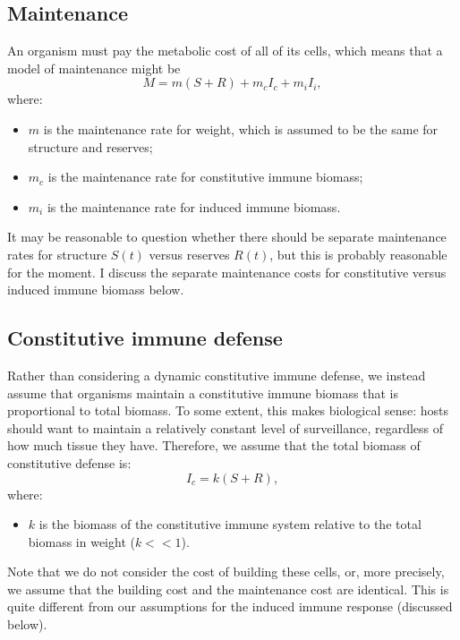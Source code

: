 \documentclass[11pt,reqno,final,pdftex]{amsart}\usepackage[]{graphicx}\usepackage[]{color}
\theoremstyle{plain}
\numberwithin{equation}{part}
\begin{document}
\subsection*{Maintenance}
An organism must pay the metabolic cost of all of its cells, which means that a model of maintenance might be
\begin{equation}
M=m(S+R)+m_cI_c+m_iI_i,
\end{equation}
where:
\begin{itemize}
\item $m$ is the maintenance rate for weight, which is assumed to be the same for structure and reserves;
\item $m_c$ is the maintenance rate for constitutive immune biomass;
\item $m_i$ is the maintenance rate for induced immune biomass.
\end{itemize}


It may be reasonable to question whether there should be separate maintenance rates for structure $S(t)$ versus reserves $R(t)$, but this is
probably reasonable for the moment. I discuss the separate maintenance costs for constitutive versus induced immune biomass below.

\subsection*{Constitutive immune defense}
Rather than considering a dynamic constitutive immune defense, we instead assume that organisms maintain a constitutive immune biomass that is proportional to total biomass. To some extent, this makes biological sense: hosts should want to maintain a relatively constant level of surveillance, regardless of how much tissue they have. Therefore, we assume that the total biomass of constitutive defense is:
\begin{equation}
I_c=k(S+R),
\end{equation}
where:
\begin{itemize}
\item $k$ is the biomass of the constitutive immune system relative to the total biomass in weight ($k<<1$).
\end{itemize}


Note that we do not consider the cost of building these cells, or, more precisely, we assume that the building cost and the maintenance cost are identical. This is quite different from our assumptions for the induced immune response (discussed below).
\end{document}
